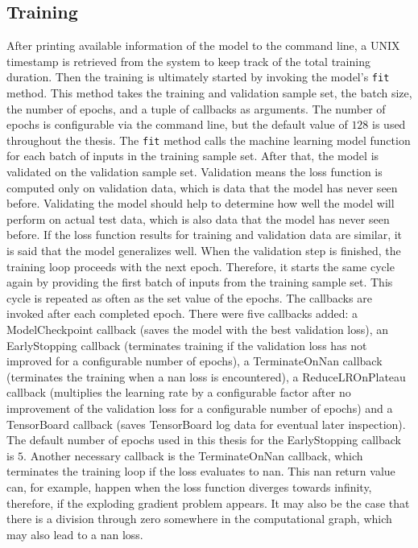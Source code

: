 \documentclass[draft,final]{vutinfth} %
\begin{document}
    \subsection{Training}
    After printing available information of the model to the command line, a UNIX timestamp is retrieved from the system to keep track of the total training duration.
    Then the training is ultimately started by invoking the model's \texttt{fit} method. This method takes the training and validation sample set, the batch size, the number of epochs, and a tuple of callbacks as arguments.
    The number of epochs is configurable via the command line, but the default value of $128$ is used throughout the thesis.
    The \texttt{fit} method calls the machine learning model function for each batch of inputs in the training sample set. After that, the model is validated on the validation sample set.
    Validation means the loss function is computed only on validation data, which is data that the model has never seen before.
    Validating the model should help to determine how well the model will perform on actual test data, which is also data that the model has never seen before.
    If the loss function results for training and validation data are similar, it is said that the model generalizes well.
    When the validation step is finished, the training loop proceeds with the next epoch. Therefore, it starts the same cycle again by providing the first batch of inputs from the training sample set.
    This cycle is repeated as often as the set value of the epochs.
    The callbacks are invoked after each completed epoch. There were five callbacks added: a ModelCheckpoint callback (saves the model with the best validation loss), an EarlyStopping callback (terminates training if the validation loss has not improved for a configurable number of epochs), a TerminateOnNan callback (terminates the training when a nan loss is encountered), a ReduceLROnPlateau callback (multiplies the learning rate by a configurable factor after no improvement of the validation loss for a configurable number of epochs) and a TensorBoard callback (saves TensorBoard log data for eventual later inspection).
    The default number of epochs used in this thesis for the EarlyStopping callback is $5$.
    Another necessary callback is the TerminateOnNan callback, which terminates the training loop if the loss evaluates to nan.
    This nan return value can, for example, happen when the loss function diverges towards infinity, therefore, if the exploding gradient problem appears.
    It may also be the case that there is a division through zero somewhere in the computational graph, which may also lead to a nan loss.
\end{document}
